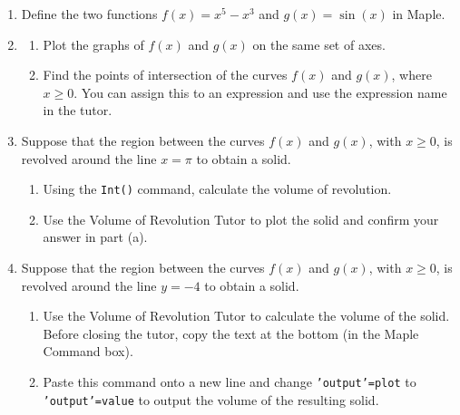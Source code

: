 \begin{enumerate}
    \item Define the two functions $f(x)=x^5-x^3$ and $g(x)=\sin(x)$ in Maple.
    \item 
    \begin{enumerate}
        \item Plot the graphs of $f(x)$ and $g(x)$ on the same set of axes.
        \item Find the points of intersection of the curves $f(x)$ and $g(x)$, where $x\geq0$.  You can assign this to an expression and use the expression name in the tutor.
    \end{enumerate}
    \item Suppose that the region between the curves $f(x)$ and $g(x)$, with $x \geq 0$, is revolved around the line $x=\pi$ to obtain a solid.
    \begin{enumerate}
        \item Using the \texttt{Int()} command, calculate the volume of revolution.
        \item Use the Volume of Revolution Tutor to plot the solid and confirm your answer in part (a).
    \end{enumerate}
    \item Suppose that the region between the curves $f(x)$ and $g(x)$, with $x \geq 0$, is revolved around the line $y=-4$ to obtain a solid.
    \begin{enumerate}
        \item Use the Volume of Revolution Tutor to calculate the volume of the solid. Before closing the tutor, copy the text at the bottom (in the Maple Command box).
        \item Paste this command onto a new line and change \texttt{'output'=plot} to \texttt{'output'=value} to output the volume of the resulting solid.
    \end{enumerate}

\end{enumerate}
